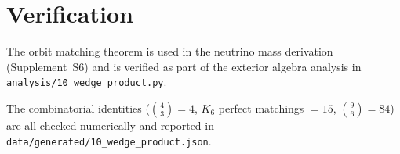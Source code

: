 \documentclass[11pt,letterpaper]{article}
\numberwithin{equation}{section}
\begin{document}
\section{Verification}
\label{sec:verification}

The orbit matching theorem is used in the neutrino mass derivation
(Supplement~S6) and is verified as part of the exterior algebra analysis
in \texttt{analysis/10\_wedge\_product.py}.

The combinatorial identities ($\binom{4}{3} = 4$, $K_6$ perfect matchings
$= 15$, $\binom{9}{6} = 84$) are all checked numerically and reported in
\texttt{data/generated/10\_wedge\_product.json}.
\end{document}
